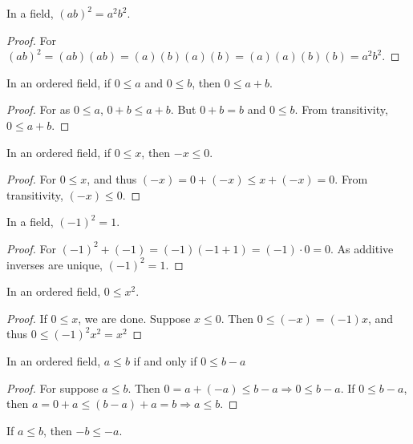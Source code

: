 \documentclass[crop=false,class=book,oneside]{standalone}
\begin{document}
            \begin{theorem}
            In a field, $(ab)^2 = a^2b^2$.
            \end{theorem}
            \begin{proof}
            For $(ab)^2 = (ab)(ab)=(a)(b)(a)(b)= (a)(a)(b)(b)=a^2b^2$.
            \end{proof}
            \begin{theorem} In an ordered field, if $0\leq a$ and $0\leq b$, then $0\leq a+b$.
            \end{theorem}
            \begin{proof}
            For as $0\leq a$, $0+b\leq a+b$. But $0+b = b$ and $0\leq b$. From transitivity, $0\leq a+b$.
            \end{proof}
            \begin{theorem}
            In an ordered field, if $0\leq x$, then $-x\leq 0$.
            \end{theorem}
            \begin{proof}
            For $0\leq x$, and thus $(-x)=0+(-x)\leq x+(-x) =0$. From transitivity, $(-x)\leq 0$.
            \end{proof}
            \begin{theorem}
            In a field, $(-1)^2 = 1$.
            \end{theorem}
            \begin{proof}
            For $(-1)^2 +(-1) = (-1)(-1+1) = (-1)\cdot 0 = 0$. As additive inverses are unique, $(-1)^2 = 1$.
            \end{proof}
            \begin{theorem}
            In an ordered field, $0\leq x^2$.
            \end{theorem}
            \begin{proof}
            If $0 \leq x$, we are done. Suppose $x\leq 0$. Then $0\leq (-x) = (-1)x$, and thus $0\leq (-1)^2 x^2=x^2$
            \end{proof}
            \begin{theorem}
            In an ordered field, $a\leq b$ if and only if $0 \leq b-a$
            \end{theorem}
            \begin{proof}
            For suppose $a\leq b$. Then $0=a+(-a)\leq b-a\Rightarrow 0 \leq b-a$. If $0\leq b-a$, then $a=0+a \leq (b-a)+a = b\Rightarrow a\leq b$.
            \end{proof}
            \begin{corollary}
            If $a\leq b$, then $-b\leq -a$.
            \end{corollary}
\end{document}

